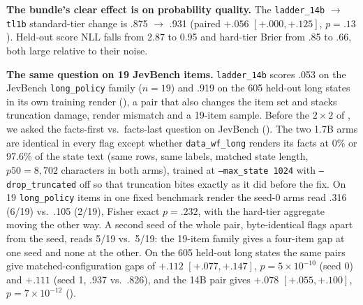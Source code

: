 \textbf{The bundle's clear effect is on probability quality.} The \texttt{ladder\_14b} $\to$
\texttt{tl1b} standard-tier change is .875 $\to$ .931 (paired $+.056$ $[+.000, +.125]$, $p{=}.13$).
Held-out score NLL falls from 2.87 to 0.95 and hard-tier Brier from .85 to .66, both large relative to
their noise.

\textbf{The same question on 19 JevBench items.} \texttt{ladder\_14b} scores .053 on the JevBench
\texttt{long\_policy} family ($n{=}19$) and .919 on the 605 held-out long states in its own training
render (), a pair that also changes the item set and stacks truncation damage, render
mismatch and a 19-item sample. Before the $2\times2$ of , we asked the
facts-first vs.\ facts-last question on JevBench (). The two 1.7B arms are identical in every
flag except whether \texttt{data\_wf\_long} renders its facts at 0\% or 97.6\% of the state text (same
rows, same labels, matched state length, $p50 = 8{,}702$ characters in both arms), trained at
\texttt{--max\_state 1024} with \texttt{--drop\_truncated} off so that truncation bites exactly as it did
before the fix. On 19 \texttt{long\_policy} items in one fixed benchmark render the seed-0 arms read
.316 (6/19) vs.\ .105 (2/19), Fisher exact $p{=}.232$, with the hard-tier aggregate moving the other way.
A second seed of the whole pair, byte-identical flags apart from the seed, reads 5/19 vs.\ 5/19: the
19-item family gives a four-item gap at one seed and none at the other. On the 605 held-out long states
the same pairs give matched-configuration gaps of $+.112$ $[+.077, +.147]$, $p = 5\times10^{-10}$ (seed 0)
and $+.111$ (seed 1, .937 vs.\ .826), and the 14B pair gives $+.078$ $[+.055, +.100]$,
$p = 7\times10^{-12}$ ().

